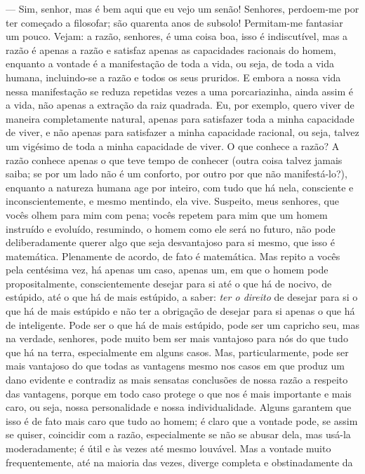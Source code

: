 --- Sim, senhor, mas é bem aqui que eu vejo um senão! Senhores, perdoem-me por
ter começado a filosofar; são quarenta anos de subsolo! Permitam-me fantasiar
um pouco. Vejam: a razão, senhores, é uma coisa boa, isso é indiscutível, mas a
razão é apenas a razão e satisfaz apenas as capacidades racionais do homem,
enquanto a vontade é a manifestação de toda a vida, ou seja, de toda a vida
humana, incluindo-se a razão e todos os seus pruridos. E embora a nossa vida
nessa manifestação se reduza repetidas vezes a uma porcariazinha, ainda assim é
a vida, não apenas a extração da raiz quadrada. Eu, por exemplo, quero viver de
maneira completamente natural, apenas para satisfazer toda a minha capacidade
de viver, e não apenas para satisfazer a minha capacidade racional, ou seja,
talvez um vigésimo de toda a minha capacidade de viver. O que conhece a razão?
A razão conhece apenas o que teve tempo de conhecer (outra coisa talvez jamais
saiba; se por um lado não é um conforto, por outro por que não manifestá-lo?),
enquanto a natureza humana age por inteiro, com tudo que há nela, consciente e
inconscientemente, e mesmo mentindo, ela vive. Suspeito, meus senhores, que
vocês olhem para mim com pena; vocês repetem para mim que um homem instruído e
evoluído, resumindo, o homem como ele será no futuro, não pode deliberadamente
querer algo que seja desvantajoso para si mesmo, que isso é matemática.
Plenamente de acordo, de fato é matemática. Mas repito a vocês pela centésima
vez, há apenas um caso, apenas um, em que o homem pode propositalmente,
conscientemente desejar para si até o que há de nocivo, de estúpido, até o que
há de mais estúpido, a saber: \textit{ter o direito} de desejar para si o que
há de mais estúpido e não ter a obrigação de desejar para si apenas o que há de
inteligente. Pode ser o que há de mais estúpido, pode ser um capricho seu, mas
na verdade, senhores, pode muito bem ser mais vantajoso para nós do que tudo
que há na terra, especialmente em alguns casos. Mas, particularmente, pode ser
mais vantajoso do que todas as vantagens mesmo nos casos em que produz um dano
evidente e contradiz as mais sensatas conclusões de nossa razão a respeito das
vantagens, porque em todo caso protege o que nos é mais importante e mais caro,
ou seja, nossa personalidade e nossa individualidade. Alguns garantem que isso
é de fato mais caro que tudo ao homem; é claro que a vontade pode, se assim se
quiser, coincidir com a razão, especialmente se não se abusar dela, mas usá-la
moderadamente; é útil e às vezes até mesmo louvável. Mas a vontade muito
frequentemente, até na maioria das vezes, diverge completa e obstinadamente da
